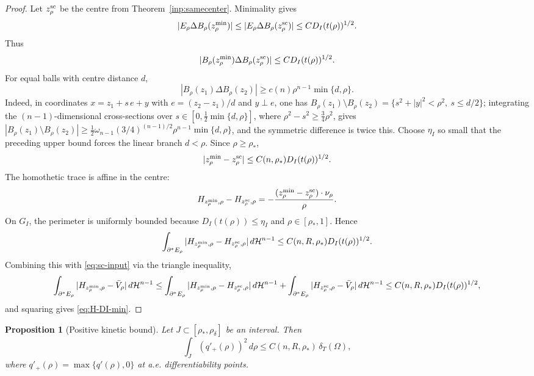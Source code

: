 \documentclass[11pt]{amsart}
\newtheorem{proposition}[theorem]{Proposition}
\theoremstyle{definition}
\newcommand{\Om}{\Omega}
\newcommand{\dT}{\delta_T}
\newcommand{\rstar}{\rho_*}
\newcommand{\rdel}{\rho_\delta}
\newcommand{\Hn}{\mathcal H^{n-1}}
\begin{document}
\begin{proof}
Let \(z_\rho^{\rm sc}\) be the centre from
Theorem~\ref{inp:samecenter}.  Minimality gives
\[
   |E_\rho\Delta B_\rho(z_\rho^{\min})|
   \le |E_\rho\Delta B_\rho(z_\rho^{\rm sc})|
   \le C D_I(t(\rho))^{1/2}.
\]
Thus
\[
   |B_\rho(z_\rho^{\min})\Delta B_\rho(z_\rho^{\rm sc})|
   \le C D_I(t(\rho))^{1/2}.
\]
For equal balls with centre distance \(d\),
\[
   |B_\rho(z_1)\Delta B_\rho(z_2)|
   \ge c(n)\rho^{n-1}\min\{d,\rho\}.
\]
Indeed, in coordinates \(x=z_1+s\,e+y\) with \(e=(z_2-z_1)/d\) and
\(y\perp e\), one has \(B_\rho(z_1)\setminus B_\rho(z_2)
=\{s^2+|y|^2<\rho^2,\ s\le d/2\}\); integrating the \((n-1)\)-dimensional
cross-sections over \(s\in[0,\tfrac12\min\{d,\rho\}]\), where
\(\rho^2-s^2\ge\tfrac34\rho^2\), gives
\(|B_\rho(z_1)\setminus B_\rho(z_2)|\ge
\tfrac12\omega_{n-1}(3/4)^{(n-1)/2}\rho^{n-1}\min\{d,\rho\}\), and the
symmetric difference is twice this.
Choose \(\eta_I\) so small that the preceding upper bound forces the
linear branch \(d<\rho\).  Since \(\rho\ge\rstar\),
\[
   |z_\rho^{\min}-z_\rho^{\rm sc}|
   \le C(n,\rstar)D_I(t(\rho))^{1/2}.
\]
The homothetic trace is affine in the centre:
\[
   H_{z_\rho^{\min},\rho}-H_{z_\rho^{\rm sc},\rho}
   =
   -\frac{(z_\rho^{\min}-z_\rho^{\rm sc})\cdot\nu_\rho}{\rho}.
\]
On \(G_I\), the perimeter is uniformly bounded because
\(D_I(t(\rho))\le\eta_I\) and \(\rho\in[\rstar,1]\).  Hence
\[
   \int_{\partial^*E_\rho}
   |H_{z_\rho^{\min},\rho}-H_{z_\rho^{\rm sc},\rho}|\,d\Hn
   \le C(n,R,\rstar)D_I(t(\rho))^{1/2}.
\]
Combining this with \eqref{eq:sc-input} via the triangle inequality,
\[
   \int_{\partial^*E_\rho}
      |H_{z_\rho^{\min},\rho}-\bar V_\rho|\,d\Hn
   \le
   \int_{\partial^*E_\rho}
      |H_{z_\rho^{\min},\rho}-H_{z_\rho^{\rm sc},\rho}|\,d\Hn
   +\int_{\partial^*E_\rho}
      |H_{z_\rho^{\rm sc},\rho}-\bar V_\rho|\,d\Hn
   \le C(n,R,\rstar)D_I(t(\rho))^{1/2},
\]
and squaring gives \eqref{eq:H-DI-min}.
\end{proof}

\begin{proposition}[Positive kinetic bound]\label{prop:positivekinetic}
Let \(J\subset[\rstar,\rdel]\) be an interval.  Then
\[
   \int_J (q'_+(\rho))^2\,d\rho
   \le C(n,R,\rstar)\,\dT(\Om),
\]
where \(q'_+(\rho)=\max\{q'(\rho),0\}\) at a.e. differentiability points.
\end{proposition}
\end{document}
